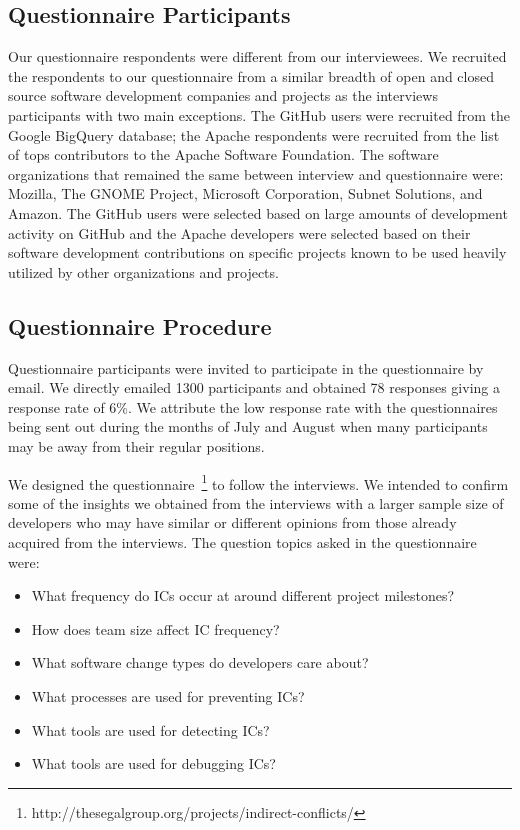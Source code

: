 \documentclass[conference]{IEEEtran}
\begin{document}
\subsection{Questionnaire Participants}

Our questionnaire respondents were different from our interviewees. We recruited the respondents to our questionnaire from a similar
breadth of open and closed source software development
companies and projects as the interviews participants with two main exceptions. The GitHub users were recruited from the Google BigQuery database; the Apache respondents were recruited from the list of tops contributors to the Apache Software Foundation.
The software organizations that remained the same between interview and questionnaire were: Mozilla, The GNOME Project, Microsoft Corporation,
Subnet Solutions, and Amazon. The GitHub
users were selected based on large amounts of development activity on GitHub and the Apache developers
were selected based on their software development contributions on specific projects known to be used heavily
utilized by other organizations and projects.

\subsection{Questionnaire Procedure}

Questionnaire participants were invited to participate in the questionnaire by email. We directly emailed 1300 participants and obtained 78 responses
giving a response rate of 6\%. We attribute the low response rate with the questionnaires
being sent out during the months of July and August when many participants may be away from their regular positions.

We designed the questionnaire~\footnote{http://thesegalgroup.org/projects/indirect-conflicts/} to follow the interviews. We intended to confirm some of the insights we obtained from the interviews with a larger sample size of developers who may have similar or different opinions from those already acquired from the interviews. The question topics asked in the questionnaire were:

\begin{itemize}
\item What frequency do ICs occur at around different project milestones?
\item How does team size affect IC frequency?
\item What software change types do developers care about?
\item What processes are used for preventing ICs?
\item What tools are used for detecting ICs?
\item What tools are used for debugging ICs?
\end{itemize}
\end{document}
